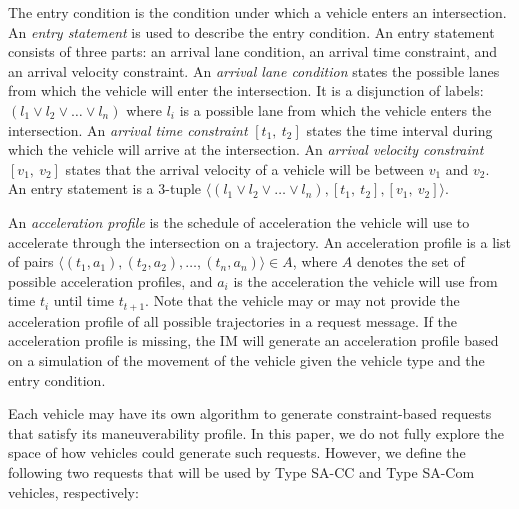 The entry condition is the condition under which a vehicle enters an
intersection.  An \emph{entry statement} is used to describe the entry
condition. An entry statement consists of three parts: an arrival
lane condition, an arrival time constraint, and an arrival velocity
constraint.  An \emph{arrival lane condition} states the possible lanes
from which the vehicle will enter the intersection.  It is a disjunction of
labels: $(l_1 \vee l_2 \vee \ldots \vee l_n)$ where $l_i$ is a
possible lane from which the vehicle enters the intersection.  An
\emph{arrival time constraint} $[t_1,\ t_2]$ states the time interval
during which the vehicle will arrive at the intersection.  An \emph{arrival
velocity constraint} $[v_1,\ v_2]$ states that the arrival velocity of
a vehicle will be between $v_1$ and $v_2$.  An entry statement is a
$3$-tuple $\langle (l_1 \vee l_2 \vee \ldots \vee l_n), [t_1,\ t_2],
[v_1,\ v_2] \rangle$.

An \emph{acceleration profile} is the schedule of acceleration the
vehicle will use to accelerate through the intersection on a
trajectory. An acceleration profile is a list of pairs $\langle (t_1,
a_1), (t_2, a_2), \ldots, (t_n, a_n) \rangle \in A$, where $A$ denotes
the set of possible acceleration profiles, and $a_i$ is the acceleration
the vehicle will use from time $t_i$ until time $t_{t+1}$.  Note that
the vehicle may or may not provide the acceleration profile of all
possible trajectories in a request message.  If the acceleration
profile is missing, the IM will generate an acceleration profile based
on a simulation of the movement of the vehicle given the vehicle type
and the entry condition.


Each vehicle may have its own algorithm to generate constraint-based
requests that satisfy its maneuverability profile.  In this paper, we
do not fully explore the space of how vehicles could generate such requests.
However, we define the following two requests that will be used by
Type SA-CC and Type SA-Com vehicles, respectively:

